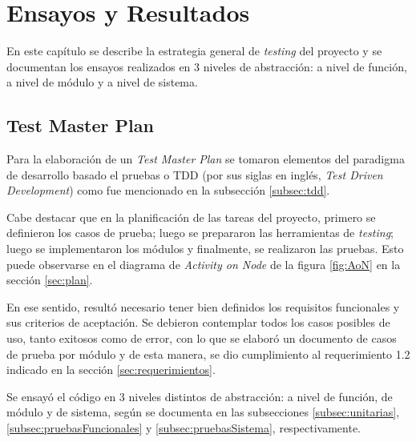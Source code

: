 
\chapter{Ensayos y Resultados} %

\label{Chapter4} %

En este capítulo se describe la estrategia general de \textit{testing} del proyecto y se documentan los ensayos realizados en 3 niveles de abstracción: a nivel de función, a nivel de módulo y a nivel de sistema.


\section{Test Master Plan}
\label{sec:masterPlan}

Para la elaboración de un \textit{Test Master Plan} se tomaron elementos del paradigma de desarrollo basado el pruebas o TDD (por sus siglas en inglés, \textit{Test Driven Development}) como fue mencionado en la subsección \ref{subsec:tdd}. 

Cabe destacar que en la planificación de las tareas del proyecto, primero se definieron los casos de prueba; luego se prepararon las herramientas de \textit{testing}; luego se implementaron los módulos y finalmente, se realizaron las pruebas. Esto puede observarse en el diagrama de \textit{Activity on Node} de la figura \ref{fig:AoN} en la sección \ref{sec:plan}.

En ese sentido, resultó necesario tener bien definidos los requisitos funcionales y sus criterios de aceptación.  Se debieron contemplar todos los casos posibles de uso, tanto exitosos como de error, con lo que se elaboró un documento \citep{TestMasterPlan} de casos de prueba por módulo  y de esta manera, se dio cumplimiento al requerimiento 1.2 indicado en la sección \ref{sec:requerimientos}.  

Se ensayó el código en 3 niveles distintos de abstracción: a nivel de función, de módulo y de sistema, según se documenta en las subsecciones \ref{subsec:unitarias}, \ref{subsec:pruebasFuncionales} y \ref{subsec:pruebasSistema}, respectivamente. 

